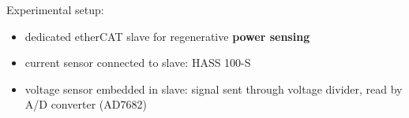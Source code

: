\documentclass[aspectratio=169]{beamer}
\begin{document}
\begin{frame}
	\begin{multicols}{2}
		\vfill\null
		Experimental setup: 
		\begin{itemize}
			\item dedicated etherCAT slave for regenerative \textbf{power sensing}
			\item current sensor connected to slave: HASS 100-S
			\item voltage sensor embedded in slave: signal sent through voltage divider, read by A/D converter (AD7682) 
		\end{itemize}
		\vfill\null
		\columnbreak
		\vfill\null
		\vspace{0.5cm}
		\begin{figure}
			\centering
		\end{figure}
	\end{multicols}
\end{frame}

\end{document}
